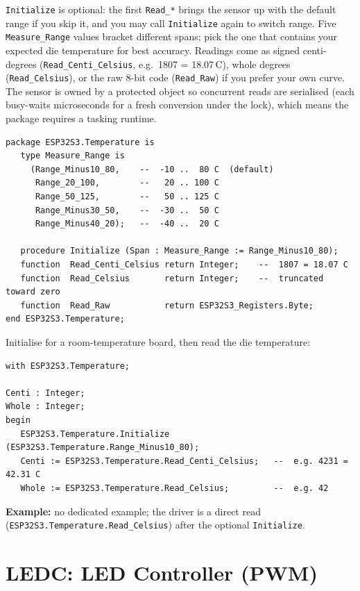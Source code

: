 \texttt{Initialize} is optional: the first \texttt{Read\_*} brings the sensor up
with the default range if you skip it, and you may call \texttt{Initialize}
again to switch range. Five \texttt{Measure\_Range} values bracket different
spans; pick the one that contains your expected die temperature for best
accuracy. Readings come as signed centi-degrees
(\texttt{Read\_Centi\_Celsius}, e.g.\ 1807 = 18.07\,\textdegree C), whole degrees
(\texttt{Read\_Celsius}), or the raw 8-bit code (\texttt{Read\_Raw}) if you
prefer your own curve. The sensor is owned by a protected object so concurrent
reads are serialised (each busy-waits microseconds for a fresh conversion under
the lock), which means the package requires a tasking runtime.

\begin{lstlisting}
package ESP32S3.Temperature is
   type Measure_Range is
     (Range_Minus10_80,    --  -10 ..  80 C  (default)
      Range_20_100,        --   20 .. 100 C
      Range_50_125,        --   50 .. 125 C
      Range_Minus30_50,    --  -30 ..  50 C
      Range_Minus40_20);   --  -40 ..  20 C

   procedure Initialize (Span : Measure_Range := Range_Minus10_80);
   function  Read_Centi_Celsius return Integer;    --  1807 = 18.07 C
   function  Read_Celsius       return Integer;    --  truncated toward zero
   function  Read_Raw           return ESP32S3_Registers.Byte;
end ESP32S3.Temperature;
\end{lstlisting}

Initialise for a room-temperature board, then read the die temperature:

\begin{lstlisting}
with ESP32S3.Temperature;

Centi : Integer;
Whole : Integer;
begin
   ESP32S3.Temperature.Initialize (ESP32S3.Temperature.Range_Minus10_80);
   Centi := ESP32S3.Temperature.Read_Centi_Celsius;   --  e.g. 4231 = 42.31 C
   Whole := ESP32S3.Temperature.Read_Celsius;         --  e.g. 42
\end{lstlisting}

\noindent\textbf{Example:} no dedicated example; the driver is a direct read
(\texttt{ESP32S3.Temperature.Read\_Celsius}) after the optional
\texttt{Initialize}.

\section{LEDC: LED Controller (PWM)}
\label{app:int:ledc}

